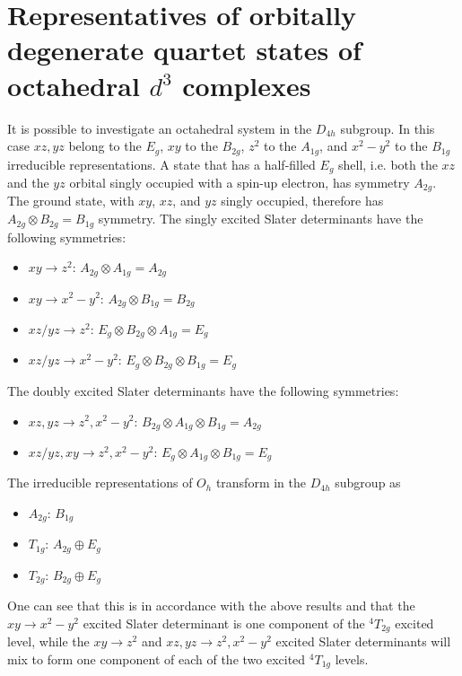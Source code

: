 \section{Representatives of orbitally degenerate quartet states of octahedral $d^3$ complexes}
\label{Sec:appendix_4T1g_D4hanalysis}
It is possible to investigate an octahedral system in the $D_{4h}$ subgroup. In this case $xz,yz$ belong to the $E_g$, $xy$ to the $B_{2g}$, $z^2$ to the $A_{1g}$, and $x^2-y^2$ to the $B_{1g}$ irreducible representations. A state that has a half-filled $E_g$ shell, i.e. both the $xz$ and the $yz$ orbital singly occupied with a spin-up electron, has symmetry $A_{2g}$. The ground state, with $xy$, $xz$, and $yz$ singly occupied, therefore has ${A_{2g}} \otimes {B_{2g}} = {B_{1g}}$ symmetry. The singly excited Slater determinants have the following symmetries:
\begin{itemize}
\item	$xy \rightarrow z^2$: ${A_{2g}} \otimes {A_{1g}} = {A_{2g}}$ 
\item	$xy \rightarrow x^2-y^2$: ${A_{2g}} \otimes {B_{1g}} = {B_{2g}}$
\item	$xz/yz \rightarrow z^2$: ${E_g} \otimes {B_{2g}} \otimes {A_{1g}} = {E_g}$
\item	$xz/yz \rightarrow x^2-y^2$: ${E_g} \otimes {B_{2g}} \otimes {B_{1g}} = {E_g}$
\end{itemize}
The doubly excited Slater determinants have the following symmetries:
\begin{itemize}
\item	$xz,yz \rightarrow z^2,x^2-y^2$: ${B_{2g}} \otimes {A_{1g}} \otimes {B_{1g}} = {A_{2g}}$
\item	$xz/yz,xy \rightarrow z^2, x^2-y^2$: ${E_g} \otimes {A_{1g}} \otimes {B_{1g}} = {E_g}$
\end{itemize}
The irreducible representations of $O_h$ transform in the $D_{4h}$ subgroup as
\begin{itemize}
\item	$A_{2g}$: $B_{1g}$
\item	$T_{1g}$: ${A_{2g}} \oplus {E_g}$
\item	$T_{2g}$: ${B_{2g}} \oplus {E_g}$
\end{itemize}
One can see that this is in accordance with the above results and that the $xy\rightarrow x^2-y^2$ excited Slater determinant is one component of the $^4T_{2g}$ excited level, while the $xy\rightarrow z^2$ and $xz,yz\rightarrow z^2,x^2-y^2$ excited Slater determinants will mix to form one component of each of the two excited $^4T_{1g}$ levels.

